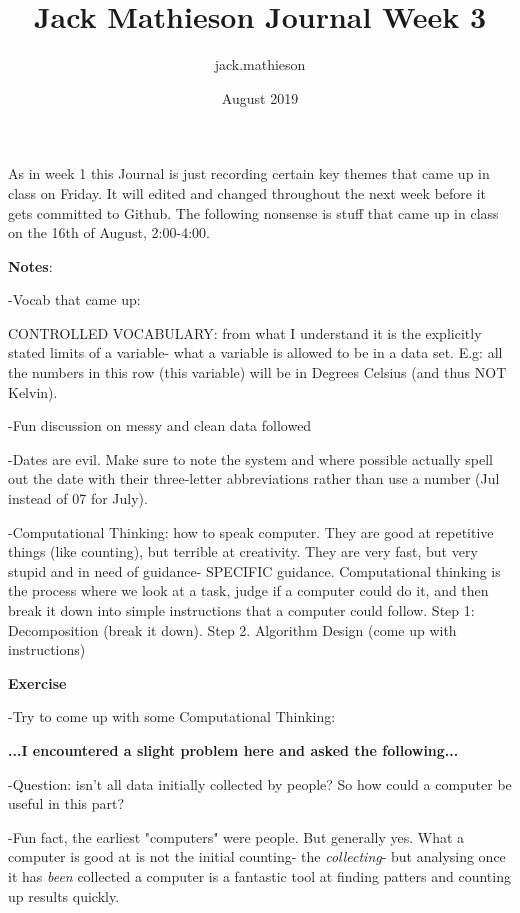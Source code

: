 \documentclass{article}
\title{Jack Mathieson Journal Week 3}
\author{jack.mathieson }
\date{August 2019}
\begin{document}
\maketitle

As in week 1 this Journal is just recording certain key themes that came up in class on Friday. It will edited and changed throughout the next week before it gets committed to Github. The following nonsense is stuff that came up in class on the 16th of August, 2:00-4:00.

\textbf{Notes}:

-Vocab that came up:

CONTROLLED VOCABULARY: from what I understand it is the explicitly stated limits of a variable- what a variable is allowed to be in a data set. E.g: all the numbers in this row (this variable) will be in Degrees Celsius (and thus NOT Kelvin).

-Fun discussion on messy and clean data followed

-Dates are evil. Make sure to note the system and where possible actually spell out the date with their three-letter abbreviations rather than use a number (Jul instead of 07 for July).

-Computational Thinking: how to speak computer. They are good at repetitive things (like counting), but terrible at creativity. They are very fast, but very stupid and in need of guidance- SPECIFIC guidance. Computational thinking is the process where we look at a task, judge if a computer could do it, and then break it down into simple instructions that a computer could follow.
Step 1: Decomposition (break it down). Step 2. Algorithm Design (come up with instructions)

\textbf{Exercise}

-Try to come up with some Computational Thinking:

\textbf{...I encountered a slight problem here and asked the following...
}

-Question: isn't all data initially collected by people? So how could a computer be useful in this part?

-Fun fact, the earliest "computers" were people. But generally yes. What a computer is good at is not the initial counting- the \textit{collecting}- but analysing once it has \textit{been} collected a computer is a fantastic tool at finding patters and counting up results quickly.
\end{document}
